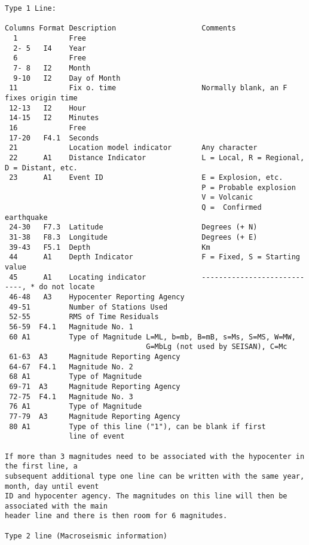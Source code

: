 \begin{verbatim}
Type 1 Line:

Columns Format Description                    Comments 
  1            Free 
  2- 5   I4    Year 
  6            Free 
  7- 8   I2    Month 
  9-10   I2    Day of Month
 11            Fix o. time                    Normally blank, an F fixes origin time 
 12-13   I2    Hour 
 14-15   I2    Minutes 
 16            Free 
 17-20   F4.1  Seconds 
 21            Location model indicator       Any character
 22      A1    Distance Indicator             L = Local, R = Regional, D = Distant, etc.
 23      A1    Event ID                       E = Explosion, etc.
                                              P = Probable explosion
                                              V = Volcanic 
                                              Q =  Confirmed earthquake
 24-30   F7.3  Latitude                       Degrees (+ N)
 31-38   F8.3  Longitude                      Degrees (+ E)
 39-43   F5.1  Depth                          Km 
 44      A1    Depth Indicator                F = Fixed, S = Starting value
 45      A1    Locating indicator             ----------------------------, * do not locate 
 46-48   A3    Hypocenter Reporting Agency
 49-51         Number of Stations Used 
 52-55         RMS of Time Residuals 
 56-59  F4.1   Magnitude No. 1
 60 A1         Type of Magnitude L=ML, b=mb, B=mB, s=Ms, S=MS, W=MW, 
                                 G=MbLg (not used by SEISAN), C=Mc
 61-63  A3     Magnitude Reporting Agency
 64-67  F4.1   Magnitude No. 2
 68 A1         Type of Magnitude
 69-71  A3     Magnitude Reporting Agency
 72-75  F4.1   Magnitude No. 3
 76 A1         Type of Magnitude
 77-79  A3     Magnitude Reporting Agency
 80 A1         Type of this line ("1"), can be blank if first
               line of event 

If more than 3 magnitudes need to be associated with the hypocenter in the first line, a
subsequent additional type one line can be written with the same year, month, day until event
ID and hypocenter agency. The magnitudes on this line will then be associated with the main
header line and there is then room for 6 magnitudes. 

Type 2 line (Macroseismic information) 


\end{verbatim}
